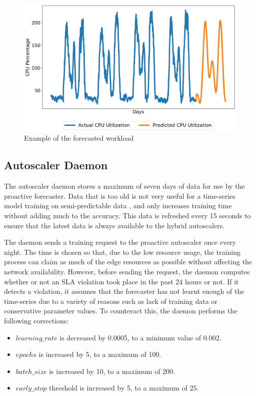 \begin{figure}[htb]
    \centering
    \caption{Example of the forecasted workload}
    \label{fig:lstm-final-data}
    \includegraphics[width=1.0\linewidth]{Figures/LSTM-Final-Data.png}
\end{figure}

\subsection{Autoscaler Daemon}
\label{subsec:ch4-auto-daemon-subsection}

The autoscaler daemon stores a maximum of seven days of data for use by the proactive forecaster. Data that is too old is not very useful for a time-series model training on semi-predictable data \cite{greff2016lstm}, and only increases training time without adding much to the accuracy. This data is refreshed every 15 seconds to ensure that the latest data is always available to the hybrid autoscalers.\par

The daemon sends a training request to the proactive autoscaler once every night. The time is chosen so that, due to the low resource usage, the training process can claim as much of the edge resources as possible without affecting the network availability. However, before sending the request, the daemon computes whether or not an SLA violation took place in the past 24 hours or not. If it detects a violation, it assumes that the forecaster has not learnt enough of the time-series due to a variety of reasons such as lack of training data or conservative parameter values. To counteract this, the daemon performs the following corrections:

\begin{itemize}
    \item $learning\_rate$ is decreased by 0.0005, to a minimum value of 0.002.
    \item $epochs$ is increased by 5, to a maximum of 100.
    \item $batch\_size$ is increased by 10, to a maximum of 200.
    \item $early\_stop$ threshold is increased by 5, to a maximum of 25.
\end{itemize}

